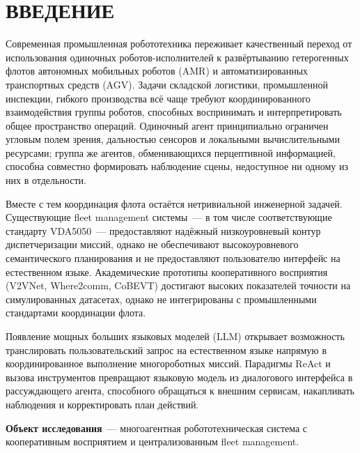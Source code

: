 \documentclass[14pt,a4paper]{extreport}
\begin{document}
\newpage
\tableofcontents

\chapter*{ВВЕДЕНИЕ}

Современная промышленная робототехника переживает качественный переход от использования одиночных роботов-исполнителей к развёртыванию гетерогенных флотов автономных мобильных роботов (AMR) и автоматизированных транспортных средств (AGV). Задачи складской логистики, промышленной инспекции, гибкого производства всё чаще требуют координированного взаимодействия группы роботов, способных воспринимать и интерпретировать общее пространство операций. Одиночный агент принципиально ограничен угловым полем зрения, дальностью сенсоров и локальными вычислительными ресурсами; группа же агентов, обменивающихся перцептивной информацией, способна совместно формировать наблюдение сцены, недоступное ни одному из них в отдельности.

Вместе с тем координация флота остаётся нетривиальной инженерной задачей. Существующие fleet management системы~--- в том числе соответствующие стандарту VDA5050~--- предоставляют надёжный низкоуровневый контур диспетчеризации миссий, однако не обеспечивают высокоуровневого семантического планирования и не предоставляют пользователю интерфейс на естественном языке. Академические прототипы кооперативного восприятия (V2VNet, Where2comm, CoBEVT) достигают высоких показателей точности на симулированных датасетах, однако не интегрированы с промышленными стандартами координации флота.

Появление мощных больших языковых моделей (LLM) открывает возможность транслировать пользовательский запрос на естественном языке напрямую в координированное выполнение многороботных миссий. Парадигмы ReAct и вызова инструментов превращают языковую модель из диалогового интерфейса в рассуждающего агента, способного обращаться к внешним сервисам, накапливать наблюдения и корректировать план действий.

\textbf{Объект исследования}~--- многоагентная робототехническая система с кооперативным восприятием и централизованным fleet management.
\end{document}

